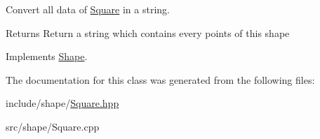 Convert all data of \hyperlink{classSquare}{Square} in a string. 

\begin{DoxyReturn}{Returns}
Return a string which contains every points of this shape 
\end{DoxyReturn}


Implements \hyperlink{classShape_a98fa87c6dc4c7045fd6897a8f3bc186c}{Shape}.



The documentation for this class was generated from the following files\+:\begin{DoxyCompactItemize}
\item 
include/shape/\hyperlink{Square_8hpp}{Square.\+hpp}\item 
src/shape/Square.\+cpp\end{DoxyCompactItemize}
